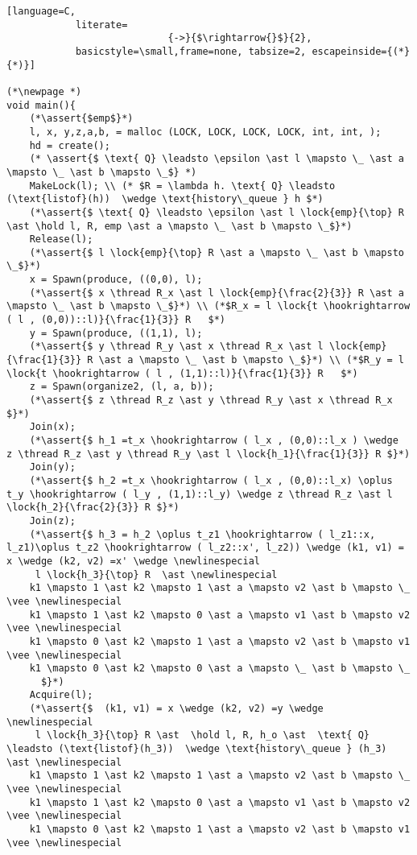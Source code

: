 \documentclass[8pt]{article}
\newcommand{\lock}[2]{ \square \hspace{-1ex} \xrightarrow[#1]{#2}}
\newcommand{\thread}{\ocircle \hspace{-1ex} \rightarrow}
\newcommand{\hold}{\text{Hold }}
\newcommand{\assert}[1]{\textcolor{blue}{ \{ #1 \}  } }
\newcommand{\newlinespecial}{\newline \hphantom{100pt}}
\begin{document}
\begin{lstlisting}[language=C,
			literate=
               				{->}{$\rightarrow{}$}{2},
			basicstyle=\small,frame=none, tabsize=2, escapeinside={(*}{*)}]
		
(*\newpage *)		
void main(){
	(*\assert{$emp$}*)
	l, x, y,z,a,b, = malloc (LOCK, LOCK, LOCK, LOCK, int, int, );
	hd = create();
	(* \assert{$ \text{ Q} \leadsto \epsilon \ast l \mapsto \_ \ast a \mapsto \_ \ast b \mapsto \_$} *)
	MakeLock(l); \\ (* $R = \lambda h. \text{ Q} \leadsto (\text{listof}(h))  \wedge \text{history\_queue } h $*)
	(*\assert{$ \text{ Q} \leadsto \epsilon \ast l \lock{emp}{\top} R \ast \hold l, R, emp \ast a \mapsto \_ \ast b \mapsto \_$}*) 	
	Release(l);
	(*\assert{$ l \lock{emp}{\top} R \ast a \mapsto \_ \ast b \mapsto \_$}*)
	x = Spawn(produce, ((0,0), l);
	(*\assert{$ x \thread R_x \ast l \lock{emp}{\frac{2}{3}} R \ast a \mapsto \_ \ast b \mapsto \_$}*) \\ (*$R_x = l \lock{t \hookrightarrow ( l , (0,0))::l)}{\frac{1}{3}} R   $*)
	y = Spawn(produce, ((1,1), l);
	(*\assert{$ y \thread R_y \ast x \thread R_x \ast l \lock{emp}{\frac{1}{3}} R \ast a \mapsto \_ \ast b \mapsto \_$}*) \\ (*$R_y = l \lock{t \hookrightarrow ( l , (1,1)::l)}{\frac{1}{3}} R   $*)
	z = Spawn(organize2, (l, a, b));
	(*\assert{$ z \thread R_z \ast y \thread R_y \ast x \thread R_x $}*) 
	Join(x);
	(*\assert{$ h_1 =t_x \hookrightarrow ( l_x , (0,0)::l_x ) \wedge  z \thread R_z \ast y \thread R_y \ast l \lock{h_1}{\frac{1}{3}} R $}*) 
	Join(y);
	(*\assert{$ h_2 =t_x \hookrightarrow ( l_x , (0,0)::l_x) \oplus t_y \hookrightarrow ( l_y , (1,1)::l_y) \wedge z \thread R_z \ast l \lock{h_2}{\frac{2}{3}} R $}*) 
	Join(z);
	(*\assert{$ h_3 = h_2 \oplus t_z1 \hookrightarrow ( l_z1::x, l_z1)\oplus t_z2 \hookrightarrow ( l_z2::x', l_z2)) \wedge (k1, v1) = x \wedge (k2, v2) =x' \wedge \newlinespecial
	 l \lock{h_3}{\top} R  \ast \newlinespecial
	k1 \mapsto 1 \ast k2 \mapsto 1 \ast a \mapsto v2 \ast b \mapsto \_ \vee \newlinespecial
	k1 \mapsto 1 \ast k2 \mapsto 0 \ast a \mapsto v1 \ast b \mapsto v2 \vee \newlinespecial
	k1 \mapsto 0 \ast k2 \mapsto 1 \ast a \mapsto v2 \ast b \mapsto v1 \vee \newlinespecial
	k1 \mapsto 0 \ast k2 \mapsto 0 \ast a \mapsto \_ \ast b \mapsto \_
	  $}*) 
	Acquire(l);
	(*\assert{$  (k1, v1) = x \wedge (k2, v2) =y \wedge \newlinespecial
	 l \lock{h_3}{\top} R \ast  \hold l, R, h_o \ast  \text{ Q} \leadsto (\text{listof}(h_3))  \wedge \text{history\_queue } (h_3) \ast \newlinespecial
	k1 \mapsto 1 \ast k2 \mapsto 1 \ast a \mapsto v2 \ast b \mapsto \_ \vee \newlinespecial
	k1 \mapsto 1 \ast k2 \mapsto 0 \ast a \mapsto v1 \ast b \mapsto v2 \vee \newlinespecial
	k1 \mapsto 0 \ast k2 \mapsto 1 \ast a \mapsto v2 \ast b \mapsto v1 \vee \newlinespecial

\end{lstlisting}
\end{document}
